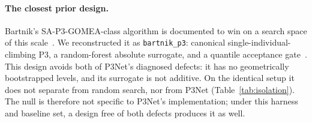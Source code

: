 \paragraph{The closest prior design.} Bartnik's SA-P3-GOMEA-class algorithm is documented to win on a search
space of this scale~\citep{bartnik2026evolutionary}. We reconstructed it as \texttt{bartnik\_p3}: canonical
single-individual-climbing P3, a random-forest absolute surrogate, and a quantile acceptance
gate~\citep{dushatskiy2021novelsurrogateassistedevolutionaryalgorithm}. This design avoids both of P3Net's
diagnosed defects: it has no geometrically bootstrapped levels, and its surrogate is not additive. On the
identical setup it does not separate from random search, nor from P3Net (Table~\ref{tab:isolation}). The null is
therefore not specific to P3Net's implementation; under this harness and baseline set, a design free of both
defects produces it as well.
